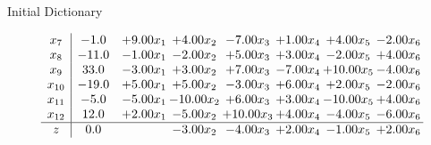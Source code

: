 \documentclass[8pt]{article}
\begin{document}
Initial Dictionary 

\[\begin{array}{c| c c@{\hskip 2pt} c@{\hskip 2pt} c@{\hskip 2pt} c@{\hskip 2pt} c@{\hskip 2pt} c@{\hskip 2pt} }
 x_{7}   &  -1.0 & +  9.00 x_{1} & +  4.00 x_{2} & -7.00 x_{3} & +  1.00 x_{4} & +  4.00 x_{5} & -2.00 x_{6}\\
 x_{8}   &  -11.0 & -1.00 x_{1} & -2.00 x_{2} & +  5.00 x_{3} & +  3.00 x_{4} & -2.00 x_{5} & +  4.00 x_{6}\\
 x_{9}   &  33.0 & -3.00 x_{1} & +  3.00 x_{2} & +  7.00 x_{3} & -7.00 x_{4} & + 10.00 x_{5} & -4.00 x_{6}\\
 x_{10}   &  -19.0 & +  5.00 x_{1} & +  5.00 x_{2} & -3.00 x_{3} & +  6.00 x_{4} & +  2.00 x_{5} & -2.00 x_{6}\\
 x_{11}   &  -5.0 & -5.00 x_{1} & -10.00 x_{2} & +  6.00 x_{3} & +  3.00 x_{4} & -10.00 x_{5} & +  4.00 x_{6}\\
 x_{12}   &  12.0 & +  2.00 x_{1} & -5.00 x_{2} & + 10.00 x_{3} & +  4.00 x_{4} & -4.00 x_{5} & -6.00 x_{6}\\
\hline
z    &  0.0  &   & -3.00 x_{2} & -4.00 x_{3} & +  2.00 x_{4} & -1.00 x_{5} & +  2.00 x_{6}\\
\end{array}\]
\end{document}
